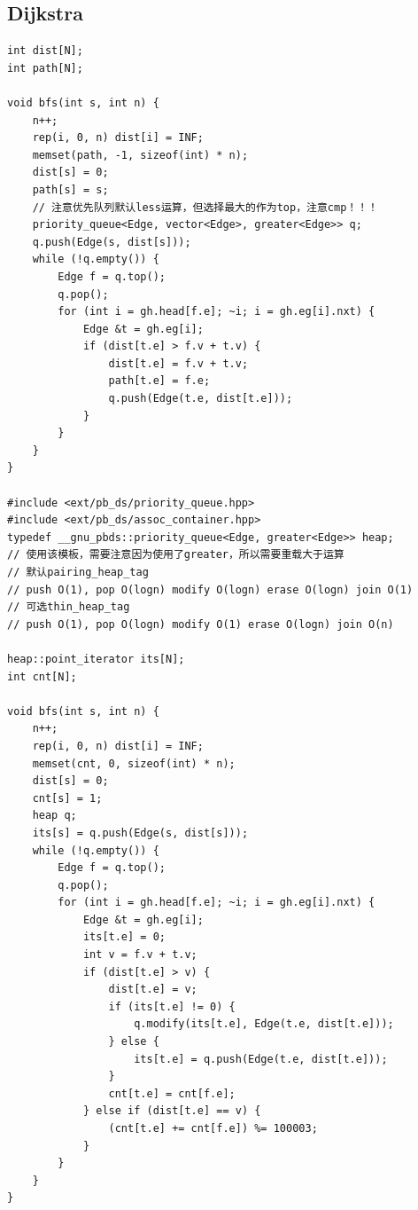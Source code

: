 \documentclass[twoside]{article}
\begin{document}
\subsection{Dijkstra}
\begin{lstlisting}
int dist[N];
int path[N];

void bfs(int s, int n) {
    n++;
    rep(i, 0, n) dist[i] = INF;
    memset(path, -1, sizeof(int) * n);
    dist[s] = 0;
    path[s] = s;
	// 注意优先队列默认less运算，但选择最大的作为top，注意cmp！！！
    priority_queue<Edge, vector<Edge>, greater<Edge>> q;
    q.push(Edge(s, dist[s]));
    while (!q.empty()) {
        Edge f = q.top();
        q.pop();
        for (int i = gh.head[f.e]; ~i; i = gh.eg[i].nxt) {
            Edge &t = gh.eg[i];
            if (dist[t.e] > f.v + t.v) {
                dist[t.e] = f.v + t.v;
                path[t.e] = f.e;
                q.push(Edge(t.e, dist[t.e]));
            }
        }
    }
}

#include <ext/pb_ds/priority_queue.hpp>
#include <ext/pb_ds/assoc_container.hpp>
typedef __gnu_pbds::priority_queue<Edge, greater<Edge>> heap;
// 使用该模板，需要注意因为使用了greater，所以需要重载大于运算
// 默认pairing_heap_tag
// push O(1), pop O(logn) modify O(logn) erase O(logn) join O(1)
// 可选thin_heap_tag
// push O(1), pop O(logn) modify O(1) erase O(logn) join O(n)

heap::point_iterator its[N];
int cnt[N];

void bfs(int s, int n) {
    n++;
    rep(i, 0, n) dist[i] = INF;
    memset(cnt, 0, sizeof(int) * n);
    dist[s] = 0;
    cnt[s] = 1;
    heap q;
    its[s] = q.push(Edge(s, dist[s]));
    while (!q.empty()) {
        Edge f = q.top();
        q.pop();
        for (int i = gh.head[f.e]; ~i; i = gh.eg[i].nxt) {
            Edge &t = gh.eg[i];
            its[t.e] = 0;
            int v = f.v + t.v;
            if (dist[t.e] > v) {
                dist[t.e] = v;
                if (its[t.e] != 0) {
                    q.modify(its[t.e], Edge(t.e, dist[t.e]));
                } else {
                    its[t.e] = q.push(Edge(t.e, dist[t.e]));
                }
                cnt[t.e] = cnt[f.e];
            } else if (dist[t.e] == v) {
                (cnt[t.e] += cnt[f.e]) %= 100003;
            }
        }
    }
}\end{lstlisting}
\end{document}

